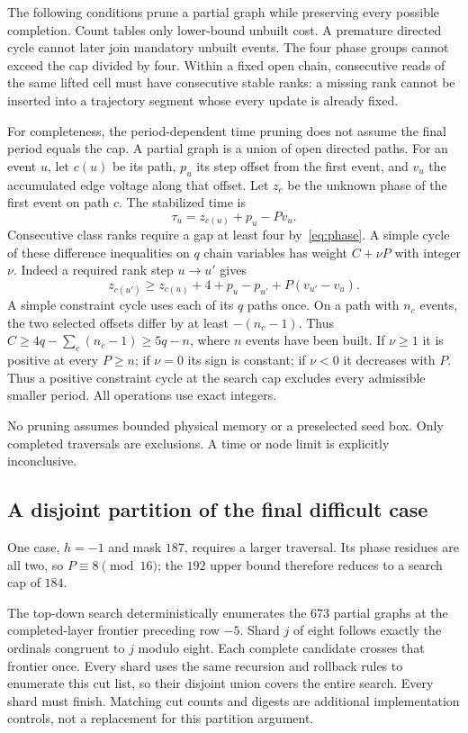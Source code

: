 \documentclass[11pt]{article}
\theoremstyle{definition}\newtheorem{definition}[theorem]{Definition}
\begin{document}
The following conditions prune a partial graph while preserving every
possible completion. Count tables only lower-bound
unbuilt cost. A premature directed cycle cannot later join mandatory unbuilt
events. The four phase groups cannot exceed the cap divided by four. Within
a fixed open chain, consecutive reads of the same lifted cell must have
consecutive stable ranks: a missing rank cannot be inserted into a trajectory
segment whose every update is already fixed.

For completeness, the period-dependent time pruning does not assume the final
period equals the cap. A partial graph is a union of open directed paths.
For an event $u$, let $c(u)$ be its path, $p_u$ its step offset from the first
event, and $v_u$ the accumulated edge voltage along that offset. Let $z_c$
be the unknown phase of the first event on path $c$. The stabilized time is
\[
\tau_u=z_{c(u)}+p_u-Pv_u.
\]
Consecutive class ranks require a gap at least four by~\eqref{eq:phase}.
A simple cycle of these difference inequalities on $q$ chain variables has
weight $C+\nu P$ with integer $\nu$. Indeed a required rank step $u\to u'$
gives
\[
 z_{c(u')}\ge z_{c(u)}+4+p_u-p_{u'}+P(v_{u'}-v_u).
\]
A simple constraint cycle uses each of its $q$ paths once. On a path with
$n_c$ events, the two selected offsets differ by at least $-(n_c-1)$.
Thus $C\ge4q-\sum_c(n_c-1)\ge5q-n$, where $n$ events have been built.
If $\nu\ge1$ it is positive at every $P\ge n$; if $\nu=0$ its sign is constant;
if $\nu<0$ it decreases with $P$. Thus a positive constraint cycle at the search
cap excludes every admissible smaller period. All operations use exact integers.

No pruning assumes bounded physical memory or a preselected seed box. Only
completed traversals are exclusions. A time or node limit is explicitly
inconclusive.

\subsection{A disjoint partition of the final difficult case}
One case, $h=-1$ and mask $187$, requires a larger traversal. Its phase residues
are all two, so $P\equiv8\pmod{16}$; the $192$ upper bound therefore reduces
to a search cap of $184$.

The top-down search deterministically enumerates the $673$ partial graphs at
the completed-layer frontier preceding row $-5$. Shard $j$ of eight follows
exactly the ordinals congruent to $j$ modulo eight. Each complete candidate
crosses that frontier once. Every shard uses the same recursion and rollback rules to enumerate this
cut list, so their disjoint union covers the entire search. Every shard must finish. Matching cut counts and
digests are additional implementation controls, not a replacement for this
partition argument.
\end{document}
